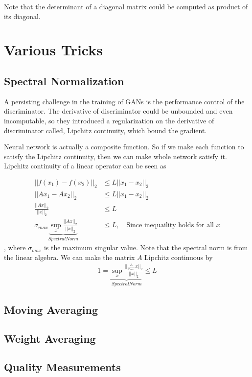 \begin{appendices}
Note that the determinant of a diagonal matrix could be computed as product of its diagonal.



\section{Various Tricks}

\subsection{Spectral Normalization}

A persisting challenge in the training of GANs is the performance control of the discriminator. The derivative of discriminator could be unbounded and even incomputable, so they introduced a regularization on the derivative of discriminator called, Lipchitz continuity, which bound the gradient.

Neural network is actually a composite function. So if we make each function to satisfy the Lipchitz continuity, then we can make whole network satisfy it. Lipchitz continuity of a linear operator can be seen as 

\begin{align*}
	||f(x_1)-f(x_2)||_2 &\leq L||x_1-x_2||_2\\
	||Ax_1-Ax_2||_2 &\leq L||x_1-x_2||_2\\
	\frac{||Ax||_2}{||x||_2}&\leq L\\
	\sigma_{max}\underbrace{\sup_x \frac{||Ax||_2}{||x||_2}}_{Spectral Norm}&\leq L, \quad \textrm{Since inequaility holds for all }x
\end{align*}
, where $\sigma_{max}$ is the maximum singular value. Note that the spectral norm is from the linear algebra. We can make the matrix $A$ Lipchitz continuous by 
\begin{align*}
1 = \underbrace{\sup_x \frac{||\frac{A}{\sigma_{max}}x||_2}{||x||_2}}_{Spectral Norm}\leq L
\end{align*}


\subsection{Moving Averaging}

\subsection{Weight Averaging}

\subsection{Quality Measurements}


\end{appendices}
